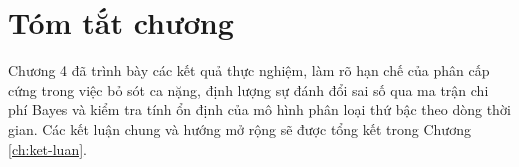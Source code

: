 \section{Tóm tắt chương}
\label{sec:tom-tat-chuong-4}

Chương 4 đã trình bày các kết quả thực nghiệm, làm rõ hạn chế của phân cấp cứng trong việc bỏ sót ca nặng, định lượng sự đánh đổi sai số qua ma trận chi phí Bayes và kiểm tra tính ổn định của mô hình phân loại thứ bậc theo dòng thời gian. Các kết luận chung và hướng mở rộng sẽ được tổng kết trong Chương \ref{ch:ket-luan}.
